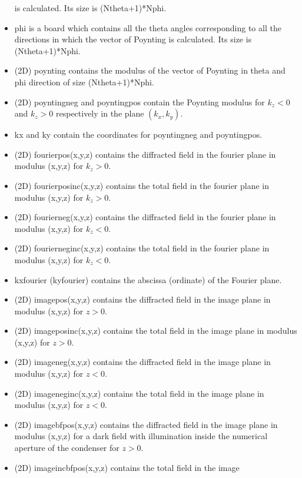 \begin{itemize}
  is calculated. Its size is (Ntheta+1)*Nphi.
\item phi is a board which contains all the theta angles corresponding
  to all the directions in which the vector of Poynting is
  calculated. Its size is (Ntheta+1)*Nphi.
\item (2D) poynting contains the modulus of the vector of
  Poynting in theta and phi direction of size (Ntheta+1)*Nphi.
\item (2D) poyntingneg and poyntingpos contain the Poynting modulus for
  $k_z<0$ and $k_z>0$ respectively in the plane $(k_x,k_y)$.
\item kx and ky contain the coordinates for poyntingneg and
  poyntingpos.
\item (2D) fourierpos(x,y,z) contains the diffracted field in the fourier
  plane in modulus (x,y,z) for $k_z>0$.
\item (2D) fourierposinc(x,y,z) contains the total field in the fourier
  plane in modulus (x,y,z) for $k_z>0$.
\item (2D) fourierneg(x,y,z) contains the diffracted field in the fourier
  plane in modulus (x,y,z) for $k_z<0$.
\item (2D) fourierneginc(x,y,z) contains the total field in the fourier
  plane in modulus (x,y,z) for $k_z<0$.
\item kxfourier (kyfourier) contains the abscissa (ordinate) of the
  Fourier plane.
\item (2D) imagepos(x,y,z) contains the diffracted field in the image
  plane in modulus (x,y,z) for $z>0$.
\item (2D) imageposinc(x,y,z) contains the total field in the image plane
  in modulus (x,y,z) for $z>0$.
\item (2D) imageneg(x,y,z) contains the diffracted field in the image
  plane in modulus (x,y,z) for $z<0$.
\item (2D) imageneginc(x,y,z) contains the total field in the image plane
  in modulus (x,y,z) for $z<0$.
\item (2D) imagebfpos(x,y,z) contains the diffracted field in the
  image plane in modulus (x,y,z) for a dark field with illumination
  inside the numerical aperture of the condenser for $z>0$.
\item (2D) imageincbfpos(x,y,z) contains the total field in the image

\end{itemize}
